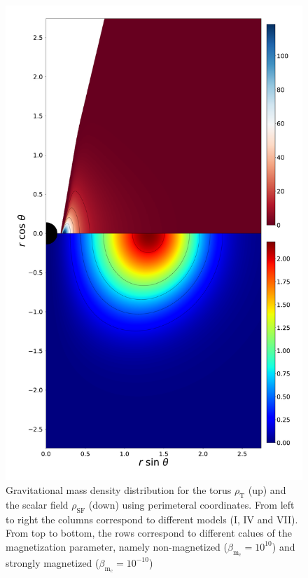 \documentclass[twocolumn,aps,showpacs,showkeys,prd,superscriptaddress,byrevtex, amsmath]{revtex4-1}
\begin{document}
\begin{figure}
\includegraphics[scale=0.12]{figures/fig6_VII__10.pdf}
\hspace{-0.2cm}
\caption{Gravitational mass density distribution for the torus $\rho_{\mathrm{T}}$ (up) and the scalar field $\rho_{\mathrm{SF}}$ (down) using perimeteral coordinates. From left to right the columns correspond to different models (I, IV and VII). From top to bottom, the rows correspond to different calues of the magnetization parameter, namely non-magnetized ($\beta_{\mathrm{m}_{\mathrm{c}}} = 10^{10}$) and strongly magnetized ($\beta_{\mathrm{m}_{\mathrm{c}}} = 10^{-10}$)}
\label{comparison_mass_density_peri}
\end{figure}
\end{document}
